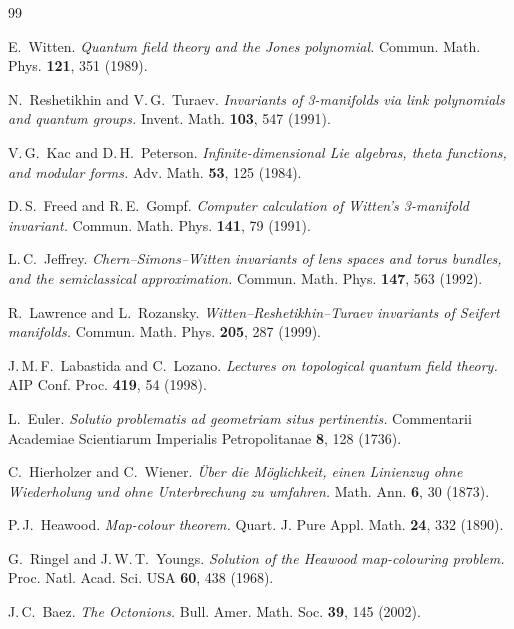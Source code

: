 \documentclass[11pt]{article}
\begin{document}
\begin{thebibliography}{99}

  E.~Witten.
  \emph{Quantum field theory and the Jones polynomial.}
  Commun. Math. Phys. \textbf{121}, 351 (1989).

  N.~Reshetikhin and V.\,G.~Turaev.
  \emph{Invariants of 3-manifolds via link polynomials and quantum
  groups.}
  Invent. Math. \textbf{103}, 547 (1991).

  V.\,G.~Kac and D.\,H.~Peterson.
  \emph{Infinite-dimensional Lie algebras, theta functions, and
  modular forms.}
  Adv. Math. \textbf{53}, 125 (1984).

  D.\,S.~Freed and R.\,E.~Gompf.
  \emph{Computer calculation of Witten's 3-manifold invariant.}
  Commun. Math. Phys. \textbf{141}, 79 (1991).

  L.\,C.~Jeffrey.
  \emph{Chern--Simons--Witten invariants of lens spaces and torus
  bundles, and the semiclassical approximation.}
  Commun. Math. Phys. \textbf{147}, 563 (1992).

  R.~Lawrence and L.~Rozansky.
  \emph{Witten--Reshetikhin--Turaev invariants of Seifert manifolds.}
  Commun. Math. Phys. \textbf{205}, 287 (1999).

  J.\,M.\,F.~Labastida and C.~Lozano.
  \emph{Lectures on topological quantum field theory.}
  AIP Conf. Proc. \textbf{419}, 54 (1998).

  L.~Euler.
  \emph{Solutio problematis ad geometriam situs pertinentis.}
  Commentarii Academiae Scientiarum Imperialis Petropolitanae
  \textbf{8}, 128 (1736).

  C.~Hierholzer and C.~Wiener.
  \emph{\"Uber die M\"oglichkeit, einen Linienzug ohne
  Wiederholung und ohne Unterbrechung zu umfahren.}
  Math. Ann. \textbf{6}, 30 (1873).

  P.\,J.~Heawood.
  \emph{Map-colour theorem.}
  Quart. J. Pure Appl. Math. \textbf{24}, 332 (1890).

  G.~Ringel and J.\,W.\,T.~Youngs.
  \emph{Solution of the Heawood map-colouring problem.}
  Proc. Natl. Acad. Sci. USA \textbf{60}, 438 (1968).

  J.\,C.~Baez.
  \emph{The Octonions.}
  Bull. Amer. Math. Soc. \textbf{39}, 145 (2002).


\end{thebibliography}
\end{document}
